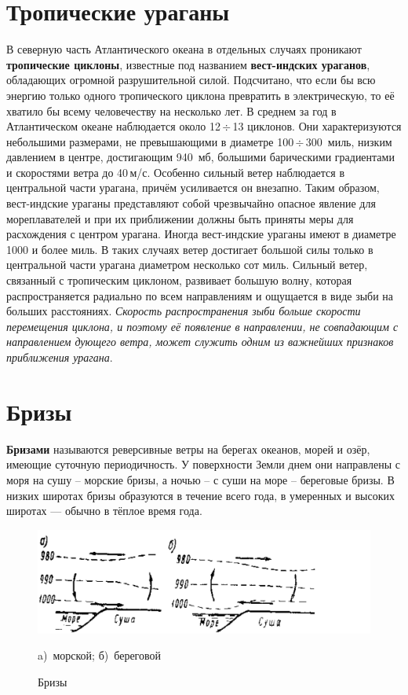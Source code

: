 \documentclass[a4paper, 12pt, twoside, final, book, russian, fittopage, cyremdash, openright]{ncc}
\newcommand{\mps}{\,м/с\xspace}
\newcommand{\otdo}{\,\ensuremath{\div}\,}
\begin{document}
\section{Тропические ураганы}
\label{sec:hurricans}

В северную часть Атлантического океана в отдельных случаях проникают
\textbf{тропические циклоны}, известные под
названием \textbf{вест-индских ураганов},
обладающих огромной разрушительной силой. Подсчитано, что если бы всю
энергию только одного тропического циклона превратить в электрическую,
то её хватило бы всему человечеству на несколько лет. В среднем за год
в Атлантическом океане наблюдается около 12\otdo{}13 циклонов. Они
характеризуются небольшими размерами, не превышающими в диаметре
100\otdo{}300~миль, низким давлением в центре, достигающим 940~мб,
большими барическими градиентами и скоростями ветра до
40\mps{}. Особенно сильный ветер наблюдается в центральной части
урагана, причём усиливается он внезапно. Таким образом, вест-индские
ураганы представляют собой чрезвычайно опасное явление для
мореплавателей и при их приближении должны быть приняты меры для
расхождения с центром урагана.  Иногда вест-индские ураганы имеют в
диаметре 1000 и более миль. В таких случаях ветер достигает большой
силы только в центральной части урагана диаметром несколько сот
миль. Сильный ветер, связанный с тропическим циклоном, развивает
большую волну, которая распространяется радиально по всем направлениям
и ощущается в виде зыби на больших расстояниях. \textit{Скорость
  распространения зыби больше скорости перемещения циклона, и поэтому
  её появление в направлении, не совпадающим с направлением дующего
  ветра, может служить одним из важнейших признаков приближения
  урагана}.

\section{Бризы}
\label{sec:breeze}

\textbf{Бризами} называются реверсивные ветры на берегах
океанов, морей и озёр, имеющие суточную периодичность. У поверхности
Земли днем они направлены с моря на сушу \--- морские бризы, а ночью
\--- с суши на море \--- береговые бризы. В низких широтах бризы
образуются в течение всего года, в умеренных и высоких широтах —
обычно в тёплое время года.

\begin{figure}[htb]
   \centering
   \includegraphics[scale=0.2]{01_breeze.png}
   \caption{Бризы}
   \label{fig:01_breeze}
   \centering{}
   \small
   a)~морской; б)~береговой
\end{figure}
\end{document}
